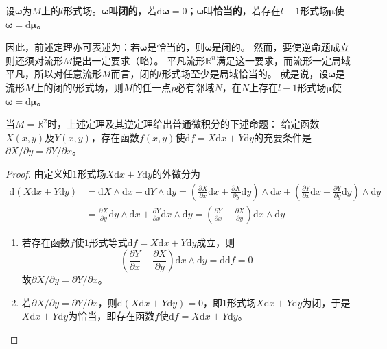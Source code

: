 \begin{definition}
    设$\bm\omega$为$M$上的$l$形式场。$\bm\omega$叫\textbf{闭的}，若$\mathrm{d}\bm\omega = 0$；$\bm\omega$叫\textbf{恰当的}，若存在$l - 1$形式场$\bm\mu$使$\bm\omega = \mathrm{d}\bm\mu$。
\end{definition}

因此，前述定理亦可表述为：若$\bm\omega$是恰当的，则$\bm\omega$是闭的。
然而，要使逆命题成立则还须对流形$M$提出一定要求（略）。
平凡流形$\mathbb{R}^n$满足这一要求，而流形一定局域平凡，所以对任意流形$M$而言，闭的$l$形式场至少是局域恰当的。
就是说，设$\bm\omega$是流形$M$上的闭的$l$形式场，则$M$的任一点$p$必有邻域$N$，在$N$上存在$l - 1$形式场$\bm\mu$使$\bm\omega = \mathrm{d}\bm\mu$。

\begin{theorem}
    当$M = \mathbb{R}^2$时，上述定理及其逆定理给出普通微积分的下述命题：
    给定函数$X(x, y)$及$Y(x, y)$，存在函数$f(x, y)$使$\mathrm{d}f = X\mathrm{d}x + Y\mathrm{d}y$的充要条件是$\partial X / \partial y = \partial Y / \partial x$。
\end{theorem}

\begin{proof}
    由定义知$1$形式场$X\mathrm{d}x + Y\mathrm{d}y$的外微分为
    \[\begin{split}
        \mathrm{d}(X\mathrm{d}x + Y\mathrm{d}y) &= \mathrm{d}X \wedge \mathrm{d}x + \mathrm{d}Y \wedge \mathrm{d}y = (\frac{\partial X}{\partial x}\mathrm{d}x + \frac{\partial X}{\partial y}\mathrm{d}y)\wedge\mathrm{d}x + (\frac{\partial Y}{\partial x}\mathrm{d}x + \frac{\partial Y}{\partial y}\mathrm{d}y)\wedge\mathrm{d}y \\
        &= \frac{\partial X}{\partial y}\mathrm{d}y \wedge \mathrm{d}x + \frac{\partial Y}{\partial x}\mathrm{d}x \wedge \mathrm{d}y = (\frac{\partial Y}{\partial x} - \frac{\partial X}{\partial y})\mathrm{d}x \wedge \mathrm{d}y
    \end{split}\]
    \begin{enumerate}[（A）]
        \item 若存在函数$f$使$1$形式等式$\mathrm{d}f = X\mathrm{d}x + Y\mathrm{d}y$成立，则
        $$(\frac{\partial Y}{\partial x} - \frac{\partial X}{\partial y})\mathrm{d}x \wedge \mathrm{d}y = \mathrm{d}\mathrm{d}f = 0$$
        故$\partial X / \partial y = \partial Y / \partial x$。
        \item 若$\partial X / \partial y = \partial Y / \partial x$，则$\mathrm{d}(X\mathrm{d}x + Y\mathrm{d}y) = 0$，即$1$形式场$X\mathrm{d}x + Y\mathrm{d}y$为闭，于是$X\mathrm{d}x + Y\mathrm{d}y$为恰当，即存在函数$f$使$\mathrm{d}f = X\mathrm{d}x + Y\mathrm{d}y$。
    \end{enumerate}
\end{proof}

